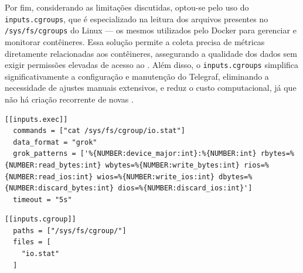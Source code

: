 Por fim, considerando as limitações discutidas, optou-se pelo uso do  \verb|inputs.cgroups|, que é especializado na leitura dos arquivos presentes no  \verb|/sys/fs/cgroups| do Linux --- os mesmos utilizados pelo Docker para gerenciar e monitorar contêineres. Essa solução permite a coleta precisa de métricas diretamente relacionadas aos contêineres, assegurando a qualidade dos dados sem exigir permissões elevadas de acesso ao . Além disso, o \verb|inputs.cgroups| simplifica significativamente a configuração e manutenção do Telegraf, eliminando a necessidade de ajustes manuais extensivos, e reduz o custo computacional, já que não há criação recorrente de novas .


\begin{lstlisting}[caption={Leitura da métrica "io.stat" com inputs.exec}, label={lst:inputs_exec}]
[[inputs.exec]]
  commands = ["cat /sys/fs/cgroup/io.stat"]
  data_format = "grok"
  grok_patterns = ['%{NUMBER:device_major:int}:%{NUMBER:int} rbytes=%{NUMBER:read_bytes:int} wbytes=%{NUMBER:write_bytes:int} rios=%{NUMBER:read_ios:int} wios=%{NUMBER:write_ios:int} dbytes=%{NUMBER:discard_bytes:int} dios=%{NUMBER:discard_ios:int}']
  timeout = "5s"
\end{lstlisting}

\begin{lstlisting}[caption={Leitura da mesma métrica "io.stat" com inputs.cgroups}, label={lst:inputs_cgroup}]
[[inputs.cgroup]]
  paths = ["/sys/fs/cgroup/"]
  files = [
    "io.stat"
  ]
\end{lstlisting}



